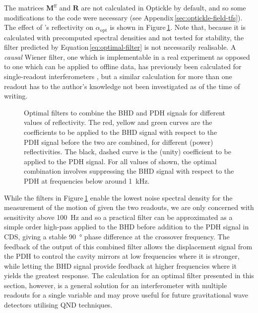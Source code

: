 The matrices $\mathbf{M}^{\textrm{ff}}$ and $\mathbf{R}$ are not calculated in Optickle by default, and so some modifications to the code were necessary (see Appendix\,\ref{sec:optickle-field-tfs}). The effect of \MNINE{}'s reflectivity on $\alpha_{\textrm{opt}}$ is shown in Figure\,\ref{fig:optimal-filters}. Note that, because it is calculated with precomputed spectral densities and not tested for stability, the filter predicted by Equation\,\ref{eq:optimal-filter} is not necessarily realisable. A \emph{causal} Wiener filter, one which is implementable in a real experiment as opposed to one which can be applied to offline data, has previously been calculated for single-readout interferometers \cite{MuellerEbhardt2009, Miao2010}, but a similar calculation for more than one readout has to the author's knowledge not been investigated as of the time of writing.

\begin{figure}
  
  \caption[Optimal filters to combine the balanced homodyne and Pound-Drever-Hall signals for different values of \MNINE{} reflectivity]{\label{fig:optimal-filters}Optimal filters to combine the \gls{BHD} and \gls{PDH} signals for different values of \MNINE{} reflectivity. The red, yellow and green curves are the coefficients to be applied to the \gls{BHD} signal with respect to the \gls{PDH} signal before the two are combined, for different \MNINE{} (power) reflectivities. The black, dashed curve is the (unity) coefficient to be applied to the \gls{PDH} signal. For all values of \MNINE{} shown, the optimal combination involves suppressing the \gls{BHD} signal with respect to the \gls{PDH} at frequencies below around \SI{1}{\kilo\hertz}.}
\end{figure}

While the filters in Figure\,\ref{fig:optimal-filters} enable the lowest noise spectral density for the measurement of the motion of \LMINUS{} given the two readouts, we are only concerned with sensitivity above \SI{100}{\hertz} and so a practical filter can be approximated as a simple  order high-pass applied to the \gls{BHD} before addition to the \gls{PDH} signal in \gls{CDS}, giving a stable \SI{90}{\degree} phase difference at the crossover frequency. The feedback of the output of this combined filter allows the displacement signal from the \gls{PDH} to control the cavity mirrors at low frequencies where it is stronger, while letting the \gls{BHD} signal provide feedback at higher frequencies where it yields the greatest response. The calculation for an optimal filter presented in this section, however, is a general solution for an interferometer with multiple readouts for a single variable and may prove useful for future gravitational wave detectors utilising \gls{QND} techniques.

